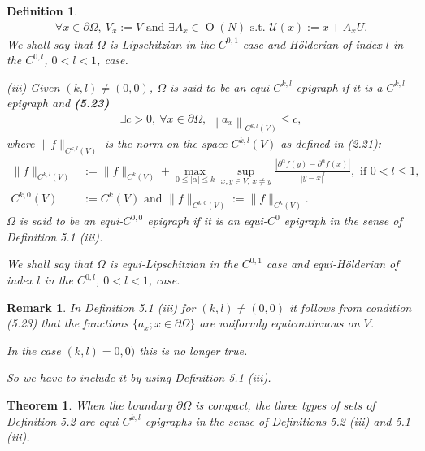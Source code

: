 \documentclass{book}
\numberwithin{equation}{section}
\newtheorem{definition}{Definition}[section]
\newtheorem{theorem}{Theorem}[section]
\newtheorem{remark}{Remark}[section]
\begin{document}
\begin{enumerate}
\begin{definition}
        \begin{align*}
            \forall x\in\partial\Omega,\ V_x := V \mbox{ and } \exists A_x\in\operatorname{O}(N) \mbox{ s.t. } \mathcal{U}(x) := x + A_xU.
        \end{align*}
        We shall say that $\Omega$ is Lipschitzian in the $C^{0,1}$ case and Hölderian of index $l$ in the $C^{0,l}$, $0 < l < 1$, case.
        \item[(iii)] Given $(k,l)\ne(0,0)$, $\Omega$ is said to be \emph{an equi-$C^{k,l}$ epigraph} if it is a $C^{k,l}$ epigraph and \textbf{(5.23)}
        \begin{align*}
            \exists c > 0,\ \forall x\in\partial\Omega,\ \left\|a_x\right\|_{C^{k,l}(V)}\le c,
        \end{align*}
        where $\|f\|_{C^{k,l}(V)}$ is the norm on the space $C^{k,l}(V)$ as defined in (2.21):
        \begin{align*}
            \|f\|_{C^{k,l}(V)} &:= \|f\|_{C^k(V)} + \max_{0\le\left|\alpha\right|\le k} \sup_{x,y\in V,\,x\ne y} \frac{\left|\partial^\alpha f(y) - \partial^\alpha f(x)\right|}{\left|y - x\right|^l}, \mbox{ if } 0 < l\le 1,\\
            C^{k,0}(V) &:= C^k(V) \mbox{ and } \|f\|_{C^{k,0}(V)} := \|f\|_{C^k(V)}.
        \end{align*}
        $\Omega$ is said to be \emph{an equi-$C^{0,0}$ epigraph} if it is an equi-$C^0$ epigraph in the sense of Definition 5.1 (iii).
        
        We shall say that $\Omega$ is \emph{equi-Lipschitzian} in the $C^{0,1}$ case and \emph{equi-Hölderian of index $l$} in the $C^{0,l}$, $0 < l < 1$, case.
    \end{definition}

    \begin{remark}
        In Definition 5.1 (iii) for $(k,l)\ne(0,0)$ it follows from condition (5.23) that the functions $\{a_x;x\in\partial\Omega\}$ are uniformly equicontinuous on $V$.
        
        In the case $(k,l) = 0,0)$ this is no longer true.
        
        So we have to include it by using Definition 5.1 (iii).
    \end{remark}

    \begin{theorem}
        When the boundary $\partial\Omega$ is compact, the three types of sets of Definition 5.2 are equi-$C^{k,l}$ epigraphs in the sense of Definitions 5.2 (iii) and 5.1 (iii).
    \end{theorem}


\end{enumerate}
\end{document}

